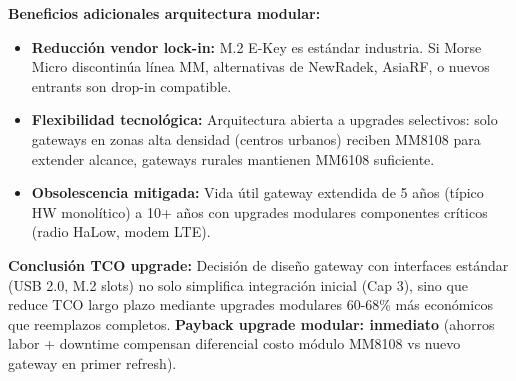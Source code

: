 \textbf{Beneficios adicionales arquitectura modular:}
\begin{itemize}
    \item \textbf{Reducción vendor lock-in:} M.2 E-Key es estándar industria. Si Morse Micro discontinúa línea MM, alternativas de NewRadek, AsiaRF, o nuevos entrants son drop-in compatible.
    \item \textbf{Flexibilidad tecnológica:} Arquitectura abierta a upgrades selectivos: solo gateways en zonas alta densidad (centros urbanos) reciben MM8108 para extender alcance, gateways rurales mantienen MM6108 suficiente.
    \item \textbf{Obsolescencia mitigada:} Vida útil gateway extendida de 5 años (típico HW monolítico) a 10+ años con upgrades modulares componentes críticos (radio HaLow, modem LTE).
\end{itemize}

\textbf{Conclusión TCO upgrade:} Decisión de diseño gateway con interfaces estándar (USB 2.0, M.2 slots) no solo simplifica integración inicial (Cap 3), sino que reduce TCO largo plazo mediante upgrades modulares 60-68\% más económicos que reemplazos completos. \textbf{Payback upgrade modular: inmediato} (ahorros labor + downtime compensan diferencial costo módulo MM8108 vs nuevo gateway en primer refresh).

